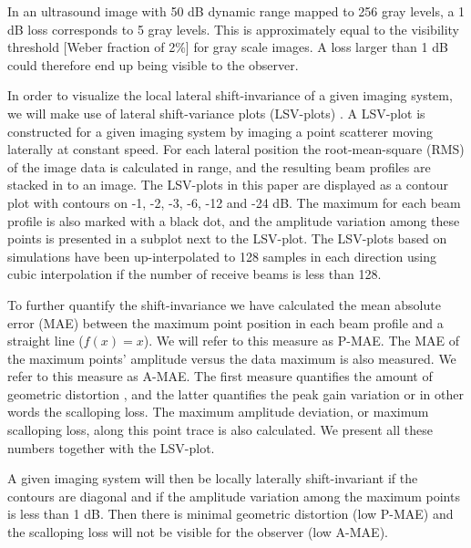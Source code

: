 \documentclass[draftcls]{IEEEtran}
\begin{document}
In an ultrasound image with 50 dB dynamic range mapped to 256 gray levels, a 1 dB loss corresponds to 5 gray levels. This is approximately equal to the visibility threshold [Weber fraction of 2\%] for gray scale images. A loss larger than 1 dB could therefore end up being visible to the observer. %



In order to visualize the local lateral shift-invariance of a given imaging system, we will make use of lateral shift-variance plots (LSV-plots) \cite{Hergum2007}. A LSV-plot is constructed for a given imaging system by imaging a point scatterer moving laterally at constant speed. For each lateral position the root-mean-square (RMS) of the image data is calculated in range, and the resulting beam profiles are stacked in to an image. %
The LSV-plots in this paper are displayed as a contour plot with contours on -1, -2, -3, -6, -12 and -24 dB. The maximum for each beam profile is also marked with a black dot, and the amplitude variation among these points is presented in a subplot next to the LSV-plot. The LSV-plots based on simulations have been up-interpolated to 128 samples in each direction using cubic interpolation if the number of receive beams is less than 128.

To further quantify the shift-invariance we have calculated the mean absolute error (MAE) between the maximum point position in each beam profile and a straight line ($f(x)=x$). We will refer to this measure as P-MAE. The MAE of the maximum points' amplitude versus the data maximum is also measured. We refer to this measure as A-MAE. The first measure quantifies the amount of geometric distortion \cite{Hergum2007}, and the latter quantifies the peak gain variation or in other words the scalloping loss. The maximum amplitude deviation, or maximum scalloping loss, along this point trace is also calculated. We present all these numbers together with the LSV-plot.

A given imaging system will then be locally laterally shift-invariant if the contours are diagonal and if the amplitude variation among the maximum points is less than 1 dB. Then there is minimal geometric distortion (low P-MAE) and the scalloping loss will not be visible for the observer (low A-MAE). %
\end{document}
